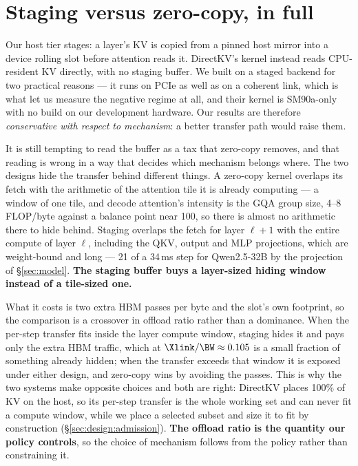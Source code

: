 
\section{Staging versus zero-copy, in full}
\label{app:coherence}

Our host tier stages: a layer's KV is copied from a pinned host mirror into a
device rolling slot before attention reads it. DirectKV's kernel instead reads
CPU-resident KV directly, with no staging buffer. We built on a staged backend
for two practical reasons --- it runs on PCIe as well as on a coherent link,
which is what let us measure the negative regime at all, and their kernel is
SM90a-only with no build on our development hardware. Our results are therefore
\emph{conservative with respect to mechanism}: a better transfer path would
raise them.

It is still tempting to read the buffer as a tax that zero-copy removes, and
that reading is wrong in a way that decides which mechanism belongs where. The
two designs hide the transfer behind different things. A zero-copy kernel
overlaps its fetch with the arithmetic of the attention tile it is already
computing --- a window of one tile, and decode attention's intensity is the GQA
group size, 4--8 FLOP/byte against a balance point near 100, so there is almost
no arithmetic there to hide behind. Staging overlaps the fetch for layer
$\ell{+}1$ with the entire compute of layer $\ell$, including the QKV, output
and MLP projections, which are weight-bound and long --- 21 of a 34\,ms step for
Qwen2.5-32B by the projection of \S\ref{sec:model}. \textbf{The staging buffer
buys a layer-sized hiding window instead of a tile-sized one.}

What it costs is two extra HBM passes per byte and the slot's own footprint, so
the comparison is a crossover in offload ratio rather than a dominance. When the
per-step transfer fits inside the layer compute window, staging hides it and pays
only the extra HBM traffic, which at $\Xlink/\BW \approx 0.105$ is a small
fraction of something already hidden; when the transfer exceeds that window it is
exposed under either design, and zero-copy wins by avoiding the passes. This is
why the two systems make opposite choices and both are right: DirectKV places
100\% of KV on the host, so its per-step transfer is the whole working set and can
never fit a compute window, while we place a selected subset and size it to fit
by construction (\S\ref{sec:design:admission}). \textbf{The offload ratio is the
quantity our policy controls}, so the choice of mechanism follows from the policy
rather than constraining it.

